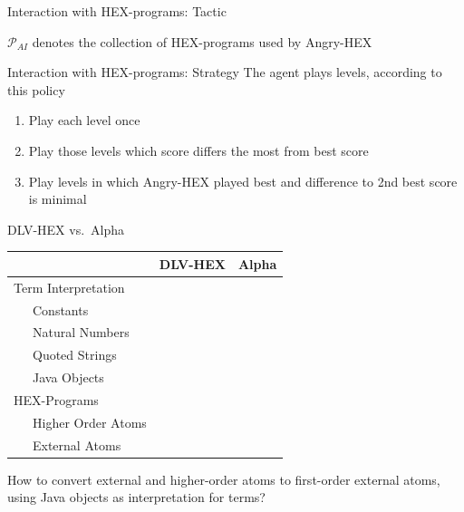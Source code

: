 \documentclass[smaller, dvipsnames]{beamer}
\newcommand{\ah}{Angry-HEX\xspace}
\newcommand{\al}{Alpha\xspace}
\begin{document}
\begin{frame}{Interaction with HEX-programs: Tactic}
	\begin{center}
\end{center}
\(\mathcal{P}_{AI}\) denotes the collection of HEX-programs used by \ah
\end{frame}

\begin{frame}{Interaction with HEX-programs: Strategy}
	The agent plays levels, according to this policy
	\begin{enumerate}
		\item Play each level once
		\item Play those levels which score differs the most from best score
		\item Play levels in which \ah played best and difference to 2nd best score is minimal
	\end{enumerate}
\end{frame}

\begin{frame}{DLV-HEX vs.\ \al}
	\begin{center}
		\begin{tabular}{lcc}
			\toprule
			& \textbf{DLV-HEX} & \textbf{\al} \\
			\midrule
			\alert{Term Interpretation} & & \\
			~~~Constants & \checkmark & \checkmark \\
			~~~Natural Numbers & \checkmark & \checkmark \\
			~~~Quoted Strings & \checkmark & \checkmark \\
			~~~Java Objects & & \checkmark \\
			\midrule
			\alert{HEX-Programs} & & \\
			~~~Higher Order Atoms & \checkmark & \\
			~~~External Atoms & \checkmark & \checkmark \\
			\bottomrule
		\end{tabular}
	\end{center}
	How to convert external and higher-order atoms to first-order external atoms, using Java objects as interpretation for terms?
\end{frame}
\end{document}
